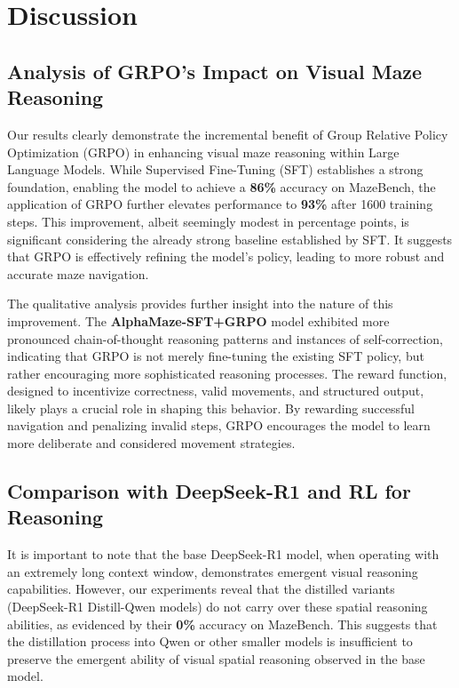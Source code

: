 \section{Discussion}
\label{sec:discussion}

\subsection{Analysis of GRPO's Impact on Visual Maze Reasoning}
\label{subsec:grpo_impact_analysis}

Our results clearly demonstrate the incremental benefit of Group Relative Policy Optimization (GRPO) in enhancing visual maze reasoning within Large Language Models.  While Supervised Fine-Tuning (SFT) establishes a strong foundation, enabling the model to achieve a \textbf{86\%} accuracy on MazeBench, the application of GRPO further elevates performance to \textbf{93\%} after 1600 training steps. This improvement, albeit seemingly modest in percentage points, is significant considering the already strong baseline established by SFT. It suggests that GRPO is effectively refining the model's policy, leading to more robust and accurate maze navigation.

The qualitative analysis provides further insight into the nature of this improvement.  The \textbf{AlphaMaze-SFT+GRPO} model exhibited more pronounced chain-of-thought reasoning patterns and instances of self-correction, indicating that GRPO is not merely fine-tuning the existing SFT policy, but rather encouraging more sophisticated reasoning processes. The reward function, designed to incentivize correctness, valid movements, and structured output, likely plays a crucial role in shaping this behavior. By rewarding successful navigation and penalizing invalid steps, GRPO encourages the model to learn more deliberate and considered movement strategies.

\subsection{Comparison with DeepSeek-R1 and RL for Reasoning}
\label{subsec:comparison_deepseek_r1}

It is important to note that the base DeepSeek-R1 model, when operating with an extremely long context window, demonstrates emergent visual reasoning capabilities. However, our experiments reveal that the distilled variants (DeepSeek-R1 Distill-Qwen models) do not carry over these spatial reasoning abilities, as evidenced by their \textbf{0\%} accuracy on MazeBench. This suggests that the distillation process into Qwen or other smaller models is insufficient to preserve the emergent ability of visual spatial reasoning observed in the base model.

